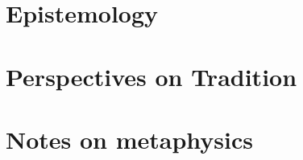 \documentclass[a4paper,12pt,twoside]{book}
\begin{document}
\chapter{Epistemology}










\chapter{Perspectives on Tradition}









\chapter{Notes on metaphysics}



\end{document}
